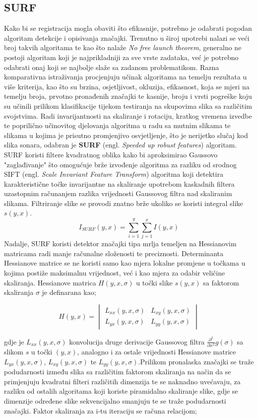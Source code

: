 \documentclass[times, utf8, diplomski]{fer}
\begin{document}
\subsection{SURF}
Kako bi se registracija mogla obaviti što efikasnije, potrebno je odabrati pogodan algoritam detekcije i opisivanja značajki. Trenutno u široj upotrebi nalazi se veći broj takvih algoritama te kao što nalaže \textit{No free launch theorem}, generalno ne postoji algoritam koji je najprikladniji za sve vrste zadataka, već je potrebno odabrati onaj koji se najbolje slaže sa zadanom problematikom. Razna komparativna istraživanja procjenjuju učinak algoritama na temelju rezultata u više kriterija, kao što su brzina, osjetljivost, okluzija, efikasnost, koja se mjeri na temelju broja, prvotno pronađenih značajki te kasnije, broju i vrsti pogreške koju su učinili prilikom klasifikacije tijekom testiranja na skupovima slika sa različitim svojstvima. Radi invarijantnosti na skaliranje i rotaciju, kratkog vremena izvedbe te poprilično učinovitog djelovanja algoritma u radu sa mutnim slikama te slikama u kojima je prisutno promjenjivo osvjetljenje, što je nerijetko slučaj kod slika sonara, odabran je \textbf{SURF} (engl. \textit{Speeded up robust features}) algoritam. SURF koristi filtere kvadratnog oblika kako bi aproksimirao Gaussovo "zaglađivanje" što omogućuje brže izvođenje algoritma za razliku od srodnog SIFT (engl. \textit{Scale Invariant Feature Transform}) algoritma koji detektira karakteristične točke invarijantne na skaliranje upotrebom kaskadnih filtera uzastopnim računanjem razlika vrijednosti Gaussovog filtra nad skaliranim slikama. Filtriranje slike se provodi znatno brže ukoliko se koristi integral slike $s(y,x)$.
$$ I_{SURF}(y,x)= \sum_{i=1}^{y} \sum_{j=1}^{x} I(y,x) $$
Nadalje, SURF koristi detektor značajki tipa mrlja temeljen na Hessianovim matricama radi manje računalne složenosti te preciznosti. Determinanta Hessianove matrice se ne koristi samo kao mjera lokalne promjene u točkama u kojima postiže maksimalnu vrijednost, već i kao mjera za odabir veličine skaliranja. Hessianove matrica $H(y,x,\sigma)$ u točki slike $s(y,x)$ sa faktorom skaliranja $\sigma$ je definarana kao;

$$ H(y,x) = \begin{vmatrix}
L_{xx}(y,x, \sigma) & L_{xy}(y,x, \sigma)\\
L_{yx}(y,x, \sigma) & L_{yy}(y,x, \sigma)
\end{vmatrix}$$

gdje je $L_{xx}(y,x, \sigma)$ konvolucija druge derivacije Gaussovog filtra $ \frac{\partial ^2}{\partial x^2}g(\sigma)$ sa slikom $s$ u točki $(y,x)$, analogno i za ostale vrijednosti Hessianove matrice $L_{yx}(y,x, \sigma)$, $L_{xy}(y,x, \sigma)$ te $L_{yy}(y,x, \sigma)$.Prilikom pronalaska značajki se traže podudarnosti između slika sa različitim faktorom skaliranja na način da se primjenjuju kvadratni filteri različitih dimenzija te se naknadno uvećavaju, za razliku od ostalih algoritama koji koriste piramidalno skaliranje slike, gdje se dimenzije određene slike sekvencijalno smanjuju te se traže podudarnosti značajki. Faktor skaliranja za  i-tu iteraciju se računa relacijom;
\end{document}
